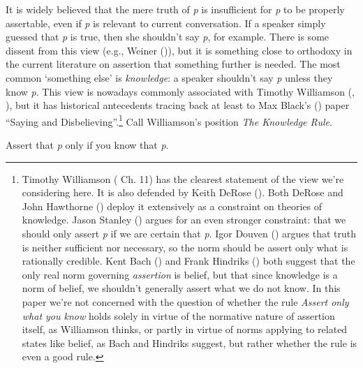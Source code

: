 \documentclass[
  11pt,
  letterpaper,
  DIV=11,
  numbers=noendperiod,
  twoside]{scrartcl}
\providecommand{\tightlist}{%
  \setlength{\itemsep}{0pt}\setlength{\parskip}{0pt}}
\begin{document}
It is widely believed that the mere truth of \emph{p} is insufficient
for \emph{p} to be properly assertable, even if \emph{p} is relevant to
current conversation. If a speaker simply guessed that \emph{p} is true,
then she shouldn't say \emph{p}, for example. There is some dissent from
this view (e.g., Weiner ()), but it is
something close to orthodoxy in the current literature on assertion that
something further is needed. The most common `something else' is
\emph{knowledge}: a speaker shouldn't say \emph{p} unless they know
\emph{p}. This view is nowadays commonly associated with Timothy
Williamson (,
), but it has historical
antecedents tracing back at least to Max Black's
() paper ``Saying and
Disbelieving''.\footnote{Timothy Williamson
  ( Ch. 11) has the
  clearest statement of the view we're considering here. It is also
  defended by Keith DeRose (). Both
  DeRose and John Hawthorne () deploy
  it extensively as a constraint on theories of knowledge. Jason Stanley
  () argues for an even stronger
  constraint: that we should only assert \emph{p} if we are certain that
  \emph{p}. Igor Douven () argues that
  truth is neither sufficient nor necessary, so the norm should be
  assert only what is rationally credible. Kent Bach
  () and Frank Hindriks
  () both suggest that the only real
  norm governing \emph{assertion} is belief, but that since knowledge is
  a norm of belief, we shouldn't generally assert what we do not know.
  In this paper we're not concerned with the question of whether the
  rule \emph{Assert only what you know} holds solely in virtue of the
  normative nature of assertion itself, as Williamson thinks, or partly
  in virtue of norms applying to related states like belief, as Bach and
  Hindriks suggest, but rather whether the rule is even a good rule.}
Call Williamson's position \emph{The Knowledge Rule}.

\begin{description}
\tightlist
\item[The Knowledge Rule]
Assert that \emph{p} only if you know that \emph{p}.
\end{description}
\end{document}
